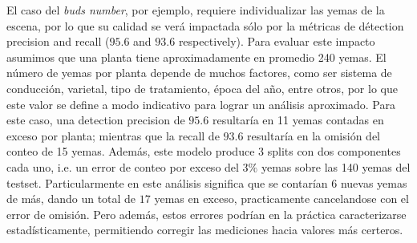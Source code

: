 \documentclass[a4paper,authoryear,review]{elsarticle}
\begin{document}
%
El caso del \emph{buds number}, por ejemplo,  requiere individualizar las yemas de la escena, por lo que su calidad se verá impactada sólo por la métricas de détection precision and recall ($95.6$ and $93.6$ respectively). Para evaluar este impacto asumimos que una planta tiene aproximadamente en promedio 240 yemas. El número de yemas por planta depende de muchos factores, como ser sistema de conducción, varietal, tipo de tratamiento, época del año, entre otros, por lo que este valor se define a modo indicativo para lograr un análisis aproximado. Para este caso, una detection precision de $95.6$ resultaría en 11 yemas contadas en exceso por planta; mientras que la recall de $93.6$ resultaría en la omisión del conteo de 15 yemas. Además, este modelo produce 3 splits con dos componentes cada uno, i.e. un error de conteo por exceso del $3\%$ yemas sobre las 140 yemas del testset. Particularmente en este análisis significa que se contarían $6$ nuevas yemas de más, dando un total de $17$ yemas en exceso, practicamente cancelandose con el error de omisión. Pero además, estos errores podrían en la práctica caracterizarse estadísticamente, permitiendo corregir las mediciones hacia valores más certeros. 
%
\end{document}
